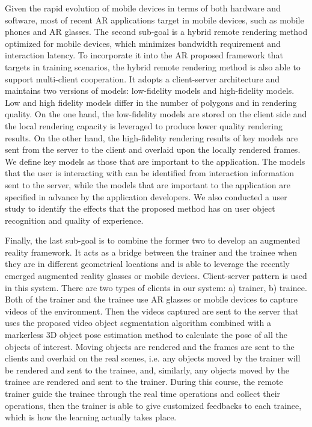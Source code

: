 Given the rapid evolution of mobile devices in terms of both hardware and software, most of recent AR applications target in mobile devices, such as mobile phones and AR glasses.
The second sub-goal is a hybrid remote rendering method optimized for mobile devices, which minimizes bandwidth requirement and interaction latency. To incorporate it into the AR proposed framework that targets in training scenarios, the hybrid remote rendering method is also able to support multi-client cooperation.
It adopts a client-server architecture and maintains two versions of models: low-fidelity models and high-fidelity models. Low and high fidelity models differ in the number of polygons and in rendering quality.
On the one hand, the low-fidelity models are stored on the client side and the local rendering capacity is leveraged to produce lower quality rendering results. On the other hand, the high-fidelity rendering results of key models are sent from the server to the client and overlaid upon the locally rendered frames.
We define key models as those that are important to the application.
The models that the user is interacting with can be identified from interaction information sent to the server, while the models that are important to the application are specified in advance by the application developers.
We also conducted a user study to identify the effects that the proposed method has on user object recognition and quality of experience.

Finally, the last sub-goal is to combine the former two to develop an augmented reality framework.
It acts as a bridge between the trainer and the trainee when they are in different geometrical locations and is able to leverage the recently emerged augmented reality glasses or mobile devices.
Client-server pattern is used in this system. There are two types of clients in our system: a) trainer, b) trainee.
Both of the trainer and the trainee use AR glasses or mobile devices to capture videos of the environment.
Then the videos captured are sent to the server that uses the proposed video object segmentation algorithm combined with a markerless 3D object pose estimation method to calculate the pose of all the objects of interest.
Moving objects are rendered and the frames are sent to the clients and overlaid on the real scenes, i.e. any objects moved by the trainer will be rendered and sent to the trainee, and, similarly, any objects moved by the trainee are rendered and sent to the trainer.
During this course, the remote trainer guide the trainee through the real time operations and collect their operations, then the trainer is able to give customized feedbacks to each trainee, which is how the learning actually takes place.

\cleardoublepage
